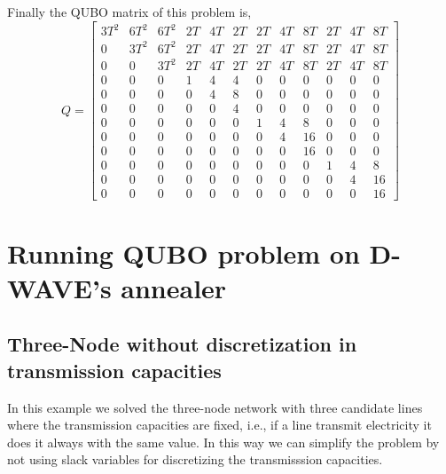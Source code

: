 Finally the QUBO matrix of this problem is,
\begin{equation}
Q =
        \begin{bmatrix}
           3T^{2} & 6T^{2} & 6T^{2} & 2T & 4T & 2T & 2T & 4T & 8T &2T & 4T & 8T  \\
           0 &3T^{2}& 6T^{2} & 2T & 4T & 2T & 2T & 4T & 8T &2T & 4T & 8T \\
           0 & 0 & 3T^{2} &2T & 4T & 2T & 2T & 4T & 8T &2T & 4T & 8T \\
           0 & 0 & 0 & 1 & 4 & 4 & 0 & 0 & 0 & 0 & 0 & 0\\
           0 & 0 & 0 & 0 & 4 & 8 & 0 & 0 & 0 & 0 & 0 & 0\\
           0 & 0 & 0 & 0 & 0 & 4 & 0 & 0 & 0 & 0 & 0 & 0\\
           0 & 0 & 0 & 0 & 0 & 0 & 1 & 4 & 8 & 0 & 0 & 0\\
           0 & 0 & 0 & 0 & 0 & 0 & 0 & 4 & 16& 0 & 0 & 0\\
           0 & 0 & 0 & 0 & 0 & 0 & 0 & 0 & 16& 0 & 0 & 0\\
           0 & 0 & 0 & 0 & 0 & 0 & 0 & 0 & 0 & 1 & 4 & 8 \\
           0 & 0 & 0 & 0 & 0 & 0 & 0 & 0 & 0 & 0 & 4 & 16\\
           0 & 0 & 0 & 0 & 0 & 0 & 0 & 0 & 0 & 0 & 0 & 16
         \end{bmatrix}
\end{equation}
\section{Running QUBO problem on D-WAVE's annealer}
\subsection{Three-Node without discretization in transmission capacities}
In this example we solved the three-node network with three candidate lines where the transmission capacities are fixed, i.e., if a line transmit electricity it does it always with the same value. In this way we can simplify the problem by not using slack variables for discretizing the transmisssion capacities.

